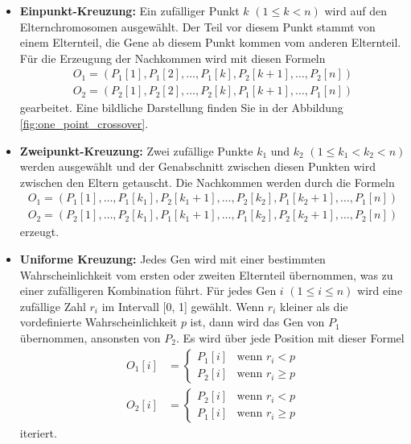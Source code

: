 \begin{itemize}
	\item \textbf{Einpunkt-Kreuzung:} Ein zufälliger Punkt \( k \) \((1 \leq k < n)\)
	wird auf den Elternchromosomen ausgewählt. Der Teil vor diesem Punkt stammt
	von einem Elternteil, die Gene ab diesem Punkt kommen vom anderen Elternteil. 
	Für die Erzeugung der Nachkommen wird mit diesen Formeln
	\begin{align*}
		O_1 = (P_1[1], P_1[2], \ldots, P_1[k], P_2[k+1], \ldots, P_2[n])\\
		O_2 = (P_2[1], P_2[2], \ldots, P_2[k], P_1[k+1], \ldots, P_1[n])
	\end{align*}
	gearbeitet. Eine bildliche Darstellung finden Sie in der Abbildung 
	\ref{fig:one_point_crossover}.
	\item \textbf{Zweipunkt-Kreuzung:} Zwei zufällige Punkte \( k_1 \) und \( k_2 \)
	\((1 \leq k_1 < k_2 < n)\) werden ausgewählt und
	der Genabschnitt zwischen diesen Punkten wird zwischen den Eltern 
	getauscht. Die Nachkommen werden durch die Formeln
	\begin{align*}
		O_1 = (P_1[1], \ldots, P_1[k_1], P_2[k_1+1], \ldots, P_2[k_2], P_1[k_2+1], \ldots, P_1[n])\\
		O_2 = (P_2[1], \ldots, P_2[k_1], P_1[k_1+1], \ldots, P_1[k_2], P_2[k_2+1], \ldots, P_2[n])
	\end{align*}
	erzeugt.
	\item \textbf{Uniforme Kreuzung:} Jedes Gen wird mit einer bestimmten
	Wahrscheinlichkeit vom ersten oder zweiten Elternteil übernommen, was zu
	einer zufälligeren Kombination führt. Für jedes Gen \( i \) \((1 \leq i \leq n)\)
	wird eine zufällige Zahl \( r_i \) im Intervall [0, 1] gewählt. Wenn
	\( r_i \) kleiner als die vordefinierte Wahrscheinlichkeit \( p \) ist,
	dann wird das Gen von \( P_1 \) übernommen, ansonsten von \( P_2 \). Es
	wird über jede Position mit dieser Formel 
	\begin{align*}
		O_1[i] &=
		\begin{cases} 
			P_1[i] & \text{wenn } r_i < p       \\
			P_2[i] & \text{wenn } r_i \geq p 
		\end{cases}
		\\
		O_2[i] &=
		\begin{cases} 
			P_2[i] & \text{wenn } r_i < p       \\
			P_1[i] & \text{wenn } r_i \geq p 
		\end{cases}
	\end{align*}
	iteriert.
\end{itemize}

